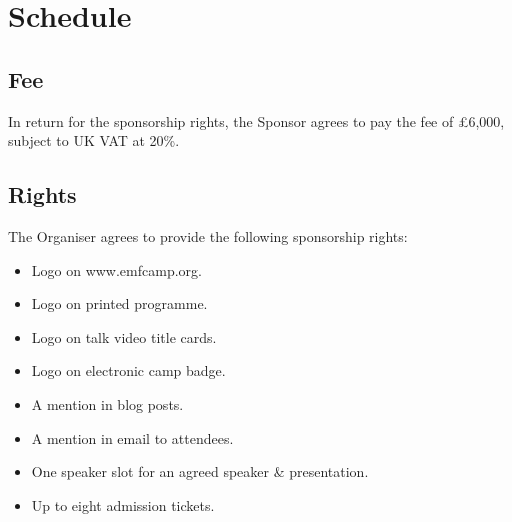 \section*{Schedule}

\subsection*{Fee}

In return for the sponsorship rights, the Sponsor agrees to pay the fee of £6,000, subject to UK VAT at 20\%.

\subsection*{Rights}

The Organiser agrees to provide the following sponsorship rights:

\begin{itemize}
    \item Logo on www.emfcamp.org.
    \item Logo on printed programme.
    \item Logo on talk video title cards.
    \item Logo on electronic camp badge.
    \item A mention in blog posts.
    \item A mention in email to attendees.
    \item One speaker slot for an agreed speaker \& presentation.
    \item Up to eight admission tickets.
\end{itemize}
